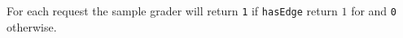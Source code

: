 For each request the sample grader will return \texttt{1} if \texttt{hasEdge} return $1$ for and \texttt{0} otherwise.